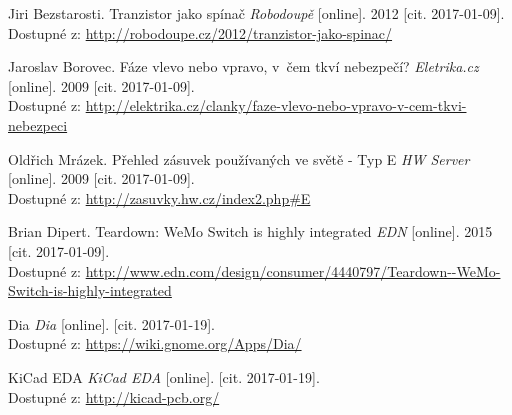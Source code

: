 \documentclass[12pt,a4paper,oneside]{article}
\begin{document}
\begin{thebibliography}{99}
Jiri Bezstarosti. Tranzistor jako spínač \emph{Robodoupě} [online]. 2012 [cit. 2017-01-09]. \\ Dostupné z: \url{http://robodoupe.cz/2012/tranzistor-jako-spinac/}

Jaroslav Borovec. Fáze vlevo nebo vpravo, v~čem tkví nebezpečí? \emph{Eletrika.cz} [online]. 2009 [cit. 2017-01-09]. \\ Dostupné z: \url{http://elektrika.cz/clanky/faze-vlevo-nebo-vpravo-v-cem-tkvi-nebezpeci}

Oldřich Mrázek. Přehled zásuvek používaných ve světě - Typ E \emph{HW Server} [online]. 2009 [cit. 2017-01-09]. \\ Dostupné z: \url{http://zasuvky.hw.cz/index2.php#E}

Brian Dipert. Teardown: WeMo Switch is highly integrated \emph{EDN} [online]. 2015 [cit. 2017-01-09]. \\ Dostupné z: \url{http://www.edn.com/design/consumer/4440797/Teardown--WeMo-Switch-is-highly-integrated}

Dia \emph{Dia} [online]. [cit. 2017-01-19]. \\ Dostupné z: \url{https://wiki.gnome.org/Apps/Dia/}

KiCad EDA \emph{KiCad EDA} [online]. [cit. 2017-01-19]. \\ Dostupné z: \url{http://kicad-pcb.org/}

\end{thebibliography}

\newpage

\listoffigures


\listoftables

\end{document}
